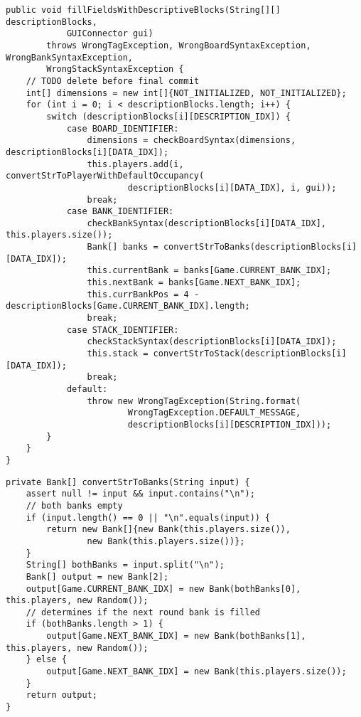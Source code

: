 \begin{lstlisting}[style=CodeHighlighting,float,caption=Converter - fillFieldsWithDescriptiveBlocks,label=lst:converter_fillFieldsWithDescriptiveBlocks]
public void fillFieldsWithDescriptiveBlocks(String[][] descriptionBlocks, 
			GUIConnector gui)
        throws WrongTagException, WrongBoardSyntaxException, WrongBankSyntaxException,
        WrongStackSyntaxException {
    // TODO delete before final commit
    int[] dimensions = new int[]{NOT_INITIALIZED, NOT_INITIALIZED};
    for (int i = 0; i < descriptionBlocks.length; i++) {
        switch (descriptionBlocks[i][DESCRIPTION_IDX]) {
            case BOARD_IDENTIFIER:
                dimensions = checkBoardSyntax(dimensions, descriptionBlocks[i][DATA_IDX]);
                this.players.add(i, convertStrToPlayerWithDefaultOccupancy(
                        descriptionBlocks[i][DATA_IDX], i, gui));
                break;
            case BANK_IDENTIFIER:
                checkBankSyntax(descriptionBlocks[i][DATA_IDX], this.players.size());
                Bank[] banks = convertStrToBanks(descriptionBlocks[i][DATA_IDX]);
                this.currentBank = banks[Game.CURRENT_BANK_IDX];
                this.nextBank = banks[Game.NEXT_BANK_IDX];
                this.currBankPos = 4 - descriptionBlocks[Game.CURRENT_BANK_IDX].length;
                break;
            case STACK_IDENTIFIER:
                checkStackSyntax(descriptionBlocks[i][DATA_IDX]);
                this.stack = convertStrToStack(descriptionBlocks[i][DATA_IDX]);
                break;
            default:
                throw new WrongTagException(String.format(
                		WrongTagException.DEFAULT_MESSAGE, 
                		descriptionBlocks[i][DESCRIPTION_IDX]));
        }
    }
}
\end{lstlisting}

\begin{lstlisting}[style=CodeHighlighting,float,caption=Converter - convertStrToBanks,label=lst:converter_convertStrToBanks]
private Bank[] convertStrToBanks(String input) {
    assert null != input && input.contains("\n");
    // both banks empty
    if (input.length() == 0 || "\n".equals(input)) {
        return new Bank[]{new Bank(this.players.size()),
                new Bank(this.players.size())};
    }
    String[] bothBanks = input.split("\n");
    Bank[] output = new Bank[2];
    output[Game.CURRENT_BANK_IDX] = new Bank(bothBanks[0], this.players, new Random());
    // determines if the next round bank is filled
    if (bothBanks.length > 1) {
        output[Game.NEXT_BANK_IDX] = new Bank(bothBanks[1], this.players, new Random());
    } else {
        output[Game.NEXT_BANK_IDX] = new Bank(this.players.size());
    }
    return output;
}
\end{lstlisting}

